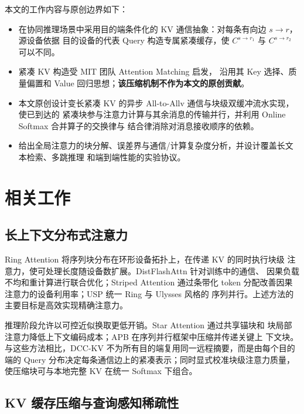 \documentclass[sigconf,nonacm]{acmart}
\begin{document}
本文的工作内容与原创边界如下：
\begin{itemize}
\item 在协同推理场景中采用目的端条件化的 KV 通信抽象：对每条有向边 $s \to r$，源设备依据
      目的设备的代表 Query 构造专属紧凑缓存，使 $C^{s \to r_1}$ 与 $C^{s \to r_2}$ 可以不同。
\item 紧凑 KV 构造受 MIT 团队 Attention Matching \cite{zweiger2026attentionmatching} 启发，
      沿用其 Key 选择、质量偏置和 Value 回归思想；\textbf{该压缩机制不作为本文的原创贡献}。
\item 本文原创设计变长紧凑 KV 的异步 All-to-Allv 通信与块级双缓冲流水实现，使已到达的
      紧凑块参与注意力计算与其余消息的传输并行，并利用 Online Softmax 合并算子的交换律与
      结合律消除对消息接收顺序的依赖。
\item 给出全局注意力的块分解、误差界与通信/计算复杂度分析，并设计覆盖长文本检索、多跳推理
      和端到端性能的实验协议。
\end{itemize}

\section{相关工作}
\label{sec:related}

\subsection{长上下文分布式注意力}

Ring Attention \cite{liu2023ring} 将序列块分布在环形设备拓扑上，在传递 KV 的同时执行块级
注意力，使可处理长度随设备数扩展。DistFlashAttn \cite{li2024distflash} 针对训练中的通信、
因果负载不均和重计算进行联合优化；Striped Attention \cite{brandon2023striped} 通过条带化
token 分配改善因果注意力的设备利用率；USP \cite{fang2024usp} 统一 Ring 与 Ulysses 风格的
序列并行。上述方法的主要目标是高效实现精确注意力。

推理阶段允许以可控近似换取更低开销。Star Attention \cite{acharya2024star} 通过共享锚块和
块局部注意力降低上下文编码成本；APB \cite{huang2025apb} 在序列并行框架中压缩并传递关键上
下文块。与这些方法相比，DCC-KV 不为所有目的端复用同一远程摘要，而是由每个目的端的 Query
分布决定每条通信边上的紧凑表示；同时显式校准块级注意力质量，使压缩块可与本地完整 KV 在统一
Softmax 下组合。

\subsection{KV 缓存压缩与查询感知稀疏性}
\end{document}
